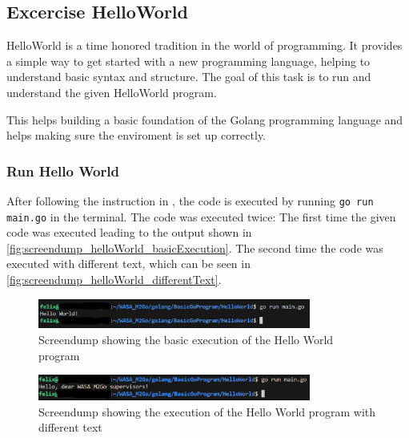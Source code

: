 \subsection{Excercise HelloWorld}
\label{sec:excercise_hello_world}
HelloWorld is a time honored tradition in the world of programming.
It provides a simple way to get started with a new programming language, helping to understand basic syntax and structure.
The goal of this task is to run and understand the given HelloWorld program.

This helps building a basic foundation of the Golang programming language and helps making sure the enviroment is set up correctly.

\subsubsection*{Run Hello World}
After following the instruction in \cite{MS-GODEV}, the code is executed by running \texttt{go run main.go} in the terminal.
The code was executed twice: The first time the given code was executed leading to the output shown in \autoref{fig:screendump_helloWorld_basicExecution}.
The second time the code was executed with different text, which can be seen in \autoref{fig:screendump_helloWorld_differentText}.

\begin{figure}[H]
    \centering
    \includegraphics[width=0.8\textwidth]{figures/goLang/helloWorld/golang_helloWorld_basicExecution.png}
    \caption{Screendump showing the basic execution of the Hello World program}
    \label{fig:screendump_helloWorld_basicExecution}
\end{figure}

\begin{figure}[H]
    \centering
    \includegraphics[width=0.8\textwidth]{figures/goLang/helloWorld/golang_helloWorld_ExecutionDifferentText.png}
    \caption{Screendump showing the execution of the Hello World program with different text}
    \label{fig:screendump_helloWorld_differentText}
\end{figure}

